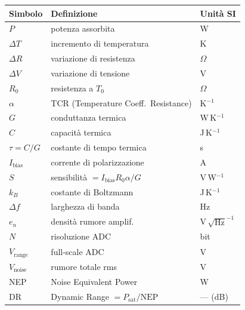 \documentclass[11pt,a4paper]{article}
\begin{document}
\begin{center}
\begin{tabular}{lll}
\toprule
Simbolo & Definizione & Unità SI \\
\midrule
$P$                  & potenza assorbita             & W \\
$\Delta T$           & incremento di temperatura     & K \\
$\Delta R$           & variazione di resistenza      & $\Omega$ \\
$\Delta V$           & variazione di tensione        & V \\
$R_0$                & resistenza a $T_0$            & $\Omega$ \\
$\alpha$             & TCR (Temperature Coeff.\ Resistance) & K$^{-1}$ \\
$G$                  & conduttanza termica           & W\,K$^{-1}$ \\
$C$                  & capacità termica              & J\,K$^{-1}$ \\
$\tau = C/G$         & costante di tempo termica     & s \\
$I_{\text{bias}}$    & corrente di polarizzazione    & A \\
$S$                  & sensibilità $= I_{\text{bias}}R_0\alpha/G$ & V\,W$^{-1}$ \\
$k_B$                & costante di Boltzmann         & J\,K$^{-1}$ \\
$\Delta f$           & larghezza di banda            & Hz \\
$e_n$                & densità rumore amplif.        & V\,$\sqrt{\text{Hz}}^{-1}$ \\
$N$                  & risoluzione ADC               & bit \\
$V_{\text{range}}$   & full-scale ADC                & V \\
$V_{\text{noise}}$   & rumore totale rms             & V \\
NEP                  & Noise Equivalent Power        & W \\
DR                   & Dynamic Range $= P_{\text{sat}}/\text{NEP}$ & --- (dB) \\
\bottomrule
\end{tabular}
\end{center}
\end{document}
